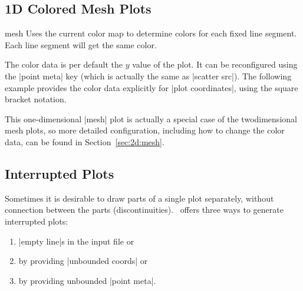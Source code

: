 {\subsection{1D Colored Mesh Plots}
\label{sec:1d:mesh}
\begin{plottype}[/pgfplots]{mesh}
	Uses the current color map to determine colors for each fixed line segment. Each line segment will get the same color.
\begin{codeexample}[]
\end{codeexample}
	The color data is per default the $y$ value of the plot. It can be reconfigured using the |point meta| key (which is actually the same as |scatter src|). The following example provides the color data explicitly for |plot coordinates|, using the square bracket notation.
\begin{codeexample}[]
\end{codeexample}
	This one-dimensional |mesh| plot is actually a special case of the twodimensional mesh plots, so more detailed configuration, including how to change the color data, can be found in Section~\ref{sec:2d:mesh}.

\end{plottype}


\subsection{Interrupted Plots}
%
\label{pgfplots:interrupt}%
Sometimes it is desirable to draw parts of a single plot separately, without connection between the parts (discontinuities). \PGFPlots\ offers three ways to generate interrupted plots: 
\begin{enumerate}
	\item |empty line|s in the input file or
	\item by providing |unbounded coords| or
	\item by providing unbounded |point meta|.
\end{enumerate}

}
